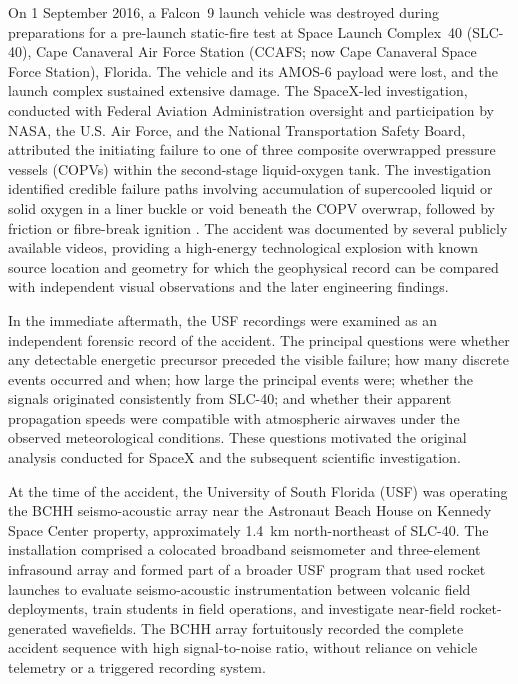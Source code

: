 \documentclass[]{seismica}
\begin{document}
On 1 September 2016, a Falcon~9 launch vehicle was destroyed during
preparations for a pre-launch static-fire test at Space Launch Complex~40
(SLC-40), Cape Canaveral Air Force Station (CCAFS; now Cape Canaveral Space
Force Station), Florida. The vehicle and its AMOS-6 payload were lost, and the
launch complex sustained extensive damage. The SpaceX-led investigation,
conducted with Federal Aviation Administration oversight and participation by
NASA, the U.S. Air Force, and the National Transportation Safety Board,
attributed the initiating failure to one of three composite overwrapped
pressure vessels (COPVs) within the second-stage liquid-oxygen tank. The
investigation identified credible failure paths involving accumulation of
supercooled liquid or solid oxygen in a liner buckle or void beneath the COPV
overwrap, followed by friction or fibre-break ignition
\citep{spacex_anomaly_2017,nasa_sma_falcon9}. The accident was documented by
several publicly available videos, providing a high-energy technological
explosion with known source location and geometry for which the geophysical
record can be compared with independent visual observations and the later
engineering findings.

In the immediate aftermath, the USF recordings were examined as an independent
forensic record of the accident. The principal questions were whether any
detectable energetic precursor preceded the visible failure; how many discrete
events occurred and when; how large the principal events were; whether the
signals originated consistently from SLC-40; and whether their apparent
propagation speeds were compatible with atmospheric airwaves under the observed
meteorological conditions. These questions motivated the original analysis
conducted for SpaceX and the subsequent scientific investigation.

At the time of the accident, the University of South Florida (USF) was
operating the BCHH seismo-acoustic array near the Astronaut Beach House on
Kennedy Space Center property, approximately 1.4~km north-northeast of SLC-40.
The installation comprised a colocated broadband seismometer and three-element
infrasound array and formed part of a broader USF program that used rocket
launches to evaluate seismo-acoustic instrumentation between volcanic field
deployments, train students in field operations, and investigate near-field
rocket-generated wavefields. The BCHH array fortuitously recorded the complete
accident sequence with high signal-to-noise ratio, without reliance on vehicle
telemetry or a triggered recording system.
\end{document}
